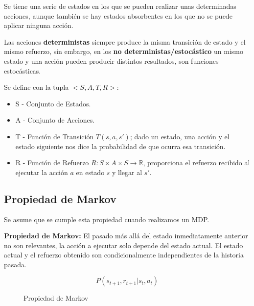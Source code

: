 \documentclass[12pt]{report} %
\begin{document}
Se tiene una serie de estados en los que se pueden realizar unas determinadas acciones, aunque también se hay estados absorbentes en los que no se puede aplicar ninguna acción.

Las acciones \textbf{deterministas} siempre produce la misma transición de estado y el mismo refuerzo, sin embargo, en los \textbf{no deterministas/estocástico} un mismo estado y una acción pueden producir distintos resultados, son funciones estocásticas.

Se define con la tupla $<S, A, T, R>$:
\begin{itemize}
  \item S - Conjunto de Estados.
  \item A - Conjunto de Acciones.
  \item T - Función de Transición $T(s, a, s')$; dado un estado, una acción y el estado siguiente nos dice la probabilidad de que ocurra esa transición.
  \item R - Función de Refuerzo $R: S \times A \times S \rightarrow \mathbb{R}$, proporciona el refuerzo recibido al ejecutar la acción $a$ en estado $s$ y llegar al $s'$.
\end{itemize}

\subsection{Propiedad de Markov}
Se asume que se cumple esta propiedad cuando realizamos un MDP.

\textbf{Propiedad de Markov:} El pasado más allá del estado inmediatamente anterior no son relevantes, la acción a ejecutar solo depende del estado actual. El estado actual y el refuerzo obtenido son condicionalmente independientes de la historia pasada.
\begin{figure}[H]
  $$P(s_{t+1}, r_{t+1}| s_t,a_t)$$
    \captionsetup{justification=centering}
  \caption{Propiedad de Markov}
\end{figure}
\end{document}
